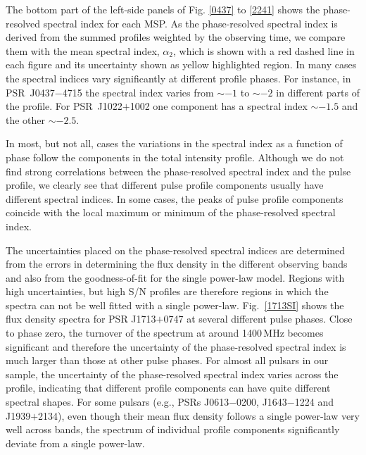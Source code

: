 \documentclass[useAMS,usenatbib]{mn2e}
\begin{document}
The bottom part of the left-side panels of Fig. \ref{0437} to 
\ref{2241} shows the phase-resolved spectral index for each MSP. 
%
As the phase-resolved spectral index is derived from the summed profiles weighted 
by the observing time, we compare them with the mean spectral index, $\alpha_2$, 
which is shown with a red dashed line in each figure and its uncertainty shown as 
yellow highlighted region.
%
In many cases the spectral indices vary significantly at different profile phases. 
For instance, in PSR~J0437$-$4715 the spectral index varies from $\sim -1$ to $\sim -2$ in 
different parts of the profile. For PSR~J1022$+$1002 one component has a spectral 
index $\sim -1.5$ and the other $\sim -2.5$. 
%

In most, but not all, cases the variations in the spectral index as a function of phase 
follow the components in the total intensity profile. 
Although we do not find strong correlations between the phase-resolved spectral 
index and the pulse profile, we clearly see that different pulse profile components usually 
have different spectral indices. In some cases, the peaks of pulse profile components 
coincide with the local maximum or minimum of the phase-resolved spectral index. 
%

%
The uncertainties placed on the phase-resolved spectral indices are determined from 
the errors in determining the flux density in the different observing bands and also 
from the goodness-of-fit for the single power-law model.  
%
Regions with high uncertainties, but high S/N profiles are therefore regions in 
which the spectra can not be well fitted with a single power-law. 
%
Fig.~\ref{1713SI} shows the flux density spectra for PSR J1713$+$0747 at several 
different pulse phases. Close to phase zero, the turnover of the spectrum at around 
1400\,MHz becomes significant and therefore the uncertainty of the phase-resolved 
spectral index is much larger than those at other pulse phases.
%
For almost all pulsars in our sample, the uncertainty of the phase-resolved spectral 
index varies across the profile, indicating that different profile components  
can have quite different spectral shapes. For some pulsars (e.g., PSRs J0613$-$0200, 
J1643$-$1224 and J1939$+$2134), even though their mean flux density follows a 
single power-law very well across bands, the spectrum of individual profile 
components significantly deviate from a single power-law.
%

%
%
\end{document}
